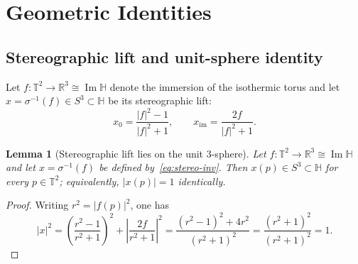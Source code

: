 \documentclass[11pt,a4paper]{article}
\theoremstyle{plain}
\newtheorem{lemma}[theorem]{Lemma}
\theoremstyle{definition}
\theoremstyle{remark}
\DeclareMathOperator{\Imag}{Im}
\newcommand{\RR}{\mathbb{R}}
\newcommand{\HH}{\mathbb{H}}            %
\newcommand{\T}{\mathbb{T}}             %
\newcommand{\abs}[1]{\lvert #1 \rvert}
\begin{document}
\section{Geometric Identities}\label{sec:analytical}

\subsection{Stereographic lift and unit-sphere identity}
\label{sec:unit-circle}
Let $f \colon \T^2 \to \RR^3 \cong \Imag\HH$ denote the immersion
of the isothermic torus and let
$x = \sigma^{-1}(f) \in S^3 \subset \HH$ be its stereographic lift:
\begin{equation}
  x_0 = \frac{\abs{f}^2 - 1}{\abs{f}^2 + 1}, \qquad
  x_{\mathrm{im}} = \frac{2f}{\abs{f}^2 + 1}.
  \label{eq:stereo-inv}
\end{equation}

\begin{lemma}[Stereographic lift lies on the unit $3$-sphere]
\label{lem:unit-x}
Let $f \colon \T^2 \to \RR^3 \cong \Imag\HH$ and let
$x = \sigma^{-1}(f)$ be defined by~\eqref{eq:stereo-inv}.  Then
$x(p) \in S^3 \subset \HH$ for every $p \in \T^2$; equivalently,
$\abs{x(p)} = 1$ identically.
\end{lemma}

\begin{proof}
Writing $r^2 = \abs{f(p)}^2$, one has
\[
  \abs{x}^2
  = \left(\frac{r^2-1}{r^2+1}\right)^2
    + \left\lvert\frac{2f}{r^2+1}\right\rvert^2
  = \frac{(r^2-1)^2+4r^2}{(r^2+1)^2}
  = \frac{(r^2+1)^2}{(r^2+1)^2}
  = 1.
\]
\end{proof}
\end{document}
